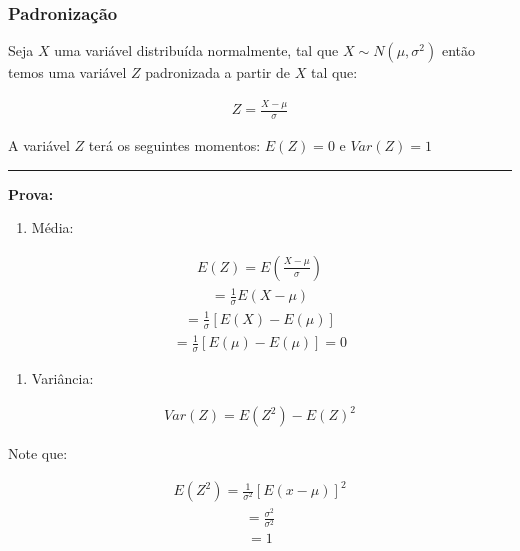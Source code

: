 \documentclass[
  letterpaper,
  DIV=11,
  numbers=noendperiod]{scrartcl}
\providecommand{\tightlist}{%
  \setlength{\itemsep}{0pt}\setlength{\parskip}{0pt}}
\begin{document}
\subsubsection{Padronização}\label{padronizauxe7uxe3o}

\begin{teorema}

Seja \(X\) uma variável distribuída normalmente, tal que
\(X \sim N(\mu ,\sigma ^{2})\) então temos uma variável \(Z\)
padronizada a partir de \(X\) tal que:

\[\begin{array}{ccc}
Z=\frac{X-\mu}{\sigma}
\end{array}\]

A variável \(Z\) terá os seguintes momentos: \(E(Z)=0\) e \(Var(Z)=1\)

\begin{center}\rule{0.5\linewidth}{0.5pt}\end{center}

\textbf{Prova:}

\begin{enumerate}
\def\labelenumi{\Roman{enumi}.}
\tightlist
\item
  Média:
\end{enumerate}

\[\begin{array}{ccc}
E(Z)=E(\frac{X-\mu}{\sigma}) 
\end{array}\] \[\begin{array}{ccc}
=\frac{1}{\sigma} E(X-\mu)
\end{array}\] \[\begin{array}{ccc}
=\frac{1}{\sigma} [E(X)-E(\mu)]
\end{array}\] \[\begin{array}{ccc}
=\frac{1}{\sigma} [E(\mu)-E(\mu)] =0
\end{array}\]

\begin{enumerate}
\def\labelenumi{\Roman{enumi}.}
\setcounter{enumi}{1}
\tightlist
\item
  Variância:
\end{enumerate}

\[\begin{array}{ccc}
Var(Z)=E(Z ^{2})-E(Z) ^{2}
\end{array}\]

Note que:

\[\begin{array}{ccc}
E(Z ^{2}) = \frac{1}{\sigma^{2}}[E(x-\mu)]^{2}
\end{array}\] \[\begin{array}{ccc}
=\frac{\sigma^{2}}{\sigma^{2}}
\end{array}\] \[\begin{array}{ccc}
=1
\end{array}\]


\end{teorema}
\end{document}
